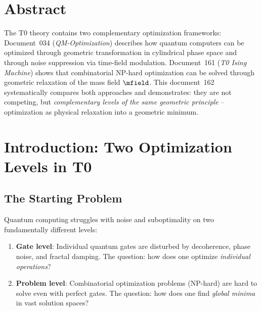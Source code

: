 
\section*{Abstract}

The T0 theory contains two complementary optimization frameworks: Document~034
(\emph{QM-Optimization}) describes how quantum computers can be optimized through
geometric transformation in cylindrical phase space and through noise suppression
via time-field modulation. Document~161 (\emph{T0 Ising Machine}) shows that
combinatorial NP-hard optimization can be solved through geometric relaxation of the
mass field $\mfield$. This document~162 systematically compares both approaches and
demonstrates: they are not competing, but \emph{complementary levels of the same
geometric principle} -- optimization as physical relaxation into a geometric minimum.

\clearpage

\section{Introduction: Two Optimization Levels in T0}
\label{sec:intro}

\subsection{The Starting Problem}

Quantum computing struggles with noise and suboptimality on two fundamentally different
levels:

\begin{enumerate}
    \item \textbf{Gate level}: Individual quantum gates are disturbed by decoherence,
    phase noise, and fractal damping. The question: how does one optimize
    \emph{individual operations}?

    \item \textbf{Problem level}: Combinatorial optimization problems (NP-hard) are
    hard to solve even with perfect gates. The question: how does one find
    \emph{global minima} in vast solution spaces?
\end{enumerate}

